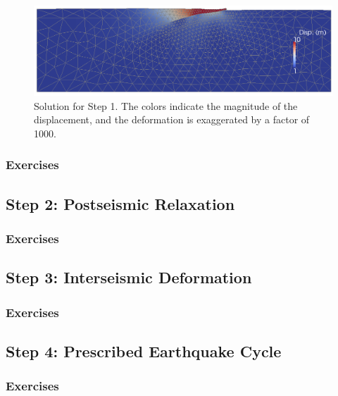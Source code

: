 \begin{figure}
  \includegraphics[width=4.5in]{examples/figs/subduction2d_step01_soln}
  \caption{Solution for Step 1. The colors indicate the magnitude of the displacement,
    and the deformation is exaggerated by a factor of 1000. }
  \label{fig:example:subduction:2d:step01}
\end{figure}


\subsubsection{Exercises}


\subsection{Step 2: Postseismic Relaxation}

\subsubsection{Exercises}


\subsection{Step 3: Interseismic Deformation}

\subsubsection{Exercises}

\subsection{Step 4: Prescribed Earthquake Cycle}

\subsubsection{Exercises}

